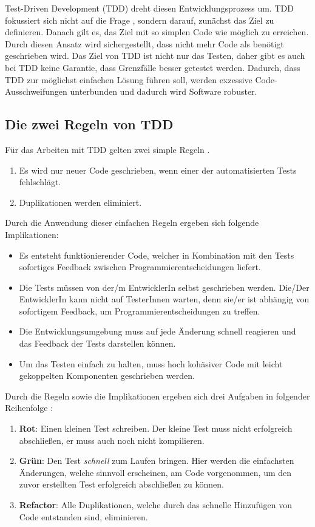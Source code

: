 Test-Driven Development (TDD) dreht diesen Entwicklungsprozess um. TDD fokussiert sich nicht auf die Frage , sondern darauf, zunächst das Ziel zu definieren. Danach gilt es, das Ziel mit so simplen Code wie möglich zu erreichen. Durch diesen Ansatz wird sichergestellt, dass nicht mehr Code als benötigt geschrieben wird. Das Ziel von TDD ist nicht nur das Testen, daher gibt es auch bei TDD keine Garantie, dass Grenzfälle besser getestet werden. Dadurch, dass TDD zur möglichst einfachen Lösung führen soll, werden exzessive Code-Ausschweifungen unterbunden und dadurch wird Software robuster.

\subsection{Die zwei Regeln von TDD}
Für das Arbeiten mit TDD gelten zwei simple Regeln \autocite[]{Beck:2003}.
\begin{enumerate}
  \item Es wird nur neuer Code geschrieben, wenn einer der automatisierten Tests fehlschlägt.
  \item Duplikationen werden eliminiert.
\end{enumerate}
Durch die Anwendung dieser einfachen Regeln ergeben sich folgende Implikationen:
\begin{itemize}
  \item Es entsteht funktionierender Code, welcher in Kombination mit den Tests sofortiges Feedback zwischen Programmierentscheidungen liefert.
  \item Die Tests müssen von der/m EntwicklerIn selbst geschrieben werden. Die/Der EntwicklerIn kann nicht auf TesterInnen warten, denn sie/er ist abhängig von sofortigem Feedback, um Programmierentscheidungen zu treffen.
  \item Die Entwicklungsumgebung muss auf jede Änderung schnell reagieren und das Feedback der Tests darstellen können.
  \item Um das Testen einfach zu halten, muss hoch kohäsiver Code mit leicht gekoppelten Komponenten geschrieben werden.
\end{itemize}
Durch die Regeln sowie die Implikationen ergeben sich drei Aufgaben in folgender Reihenfolge \autocite{Beck:2003}:
\begin{enumerate}
  \item \textbf{Rot}: Einen kleinen Test schreiben.\newline
  Der kleine Test muss nicht erfolgreich abschließen, er muss auch noch nicht kompilieren.
  \item \textbf{Grün}: Den Test \textit{schnell} zum Laufen bringen.\newline
  Hier werden die einfachsten Änderungen, welche sinnvoll erscheinen, am Code vorgenommen, um den zuvor erstellten Test erfolgreich abschließen zu können.
  \item \textbf{Refactor}: Alle Duplikationen, welche durch das schnelle Hinzufügen von Code entstanden sind, eliminieren.
\end{enumerate}
